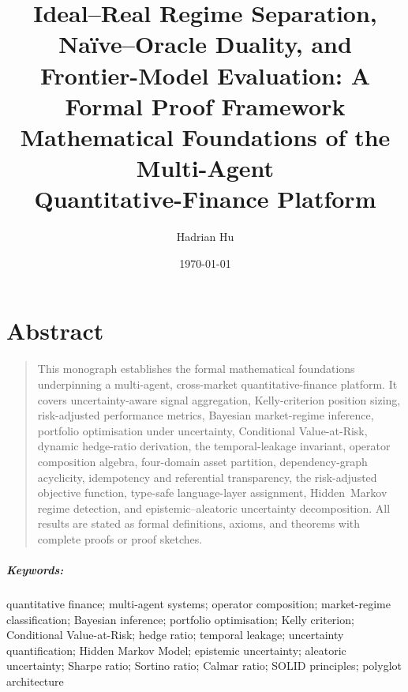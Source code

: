 \documentclass[12pt,openany]{book}
\title{Ideal--Real Regime Separation, Na\"{i}ve--Oracle Duality, and\\
Frontier-Model Evaluation: A Formal Proof Framework\\[0.6em]
{\large Mathematical Foundations of the Multi-Agent\\
Quantitative-Finance Platform}}
\author{Hadrian Hu}
\date{\today}
\numberwithin{equation}{chapter}
\theoremstyle{plain}
\theoremstyle{definition}
\theoremstyle{remark}
\newenvironment{abstract}{%
  \chapter*{Abstract}
  \begin{quote}\small
}{%
  \end{quote}
}
\newenvironment{keywords}{%
  \paragraph*{Keywords:}
}{%
}
\numberwithin{equation}{chapter}
\theoremstyle{plain}
\begin{document}
\maketitle

\label{thm:uncertainty-bounded}
\label{thm:kelly-optimal}
\label{thm:kelly-ruin}
\label{thm:sharpe-bound}
\label{thm:sortino-ge-sharpe}
\label{thm:calmar-bound}
\label{thm:bayes-convergence}
\label{thm:portfolio-opt}
\label{thm:cvar-bound}
\label{thm:assoc}
\label{thm:acyclic-decidable}
\label{thm:idempotent}
\label{thm:leakage-invariant}
\label{thm:type-safe}
\label{thm:hmm-convergence}
\label{thm:uncertainty-decomp}

\tableofcontents
\listoftheorems[ignoreall,show={theorem,lemma,proposition,corollary,definition,axiom,assumption,conjecture}]

\begin{abstract}
This monograph establishes the formal mathematical foundations underpinning
a multi-agent, cross-market quantitative-finance platform.  It covers
uncertainty-aware signal aggregation, Kelly-criterion position sizing,
risk-adjusted performance metrics, Bayesian market-regime inference,
portfolio optimisation under uncertainty, Conditional Value-at-Risk,
dynamic hedge-ratio derivation, the temporal-leakage invariant, operator
composition algebra, four-domain asset partition, dependency-graph
acyclicity, idempotency and referential transparency, the risk-adjusted
objective function, type-safe language-layer assignment, Hidden~Markov
regime detection, and epistemic--aleatoric uncertainty decomposition.
All results are stated as formal definitions, axioms, and theorems with
complete proofs or proof sketches.
\end{abstract}

\begin{keywords}
quantitative finance; multi-agent systems; operator composition; market-regime
classification; Bayesian inference; portfolio optimisation; Kelly criterion;
Conditional Value-at-Risk; hedge ratio; temporal leakage; uncertainty
quantification; Hidden Markov Model; epistemic uncertainty; aleatoric uncertainty;
Sharpe ratio; Sortino ratio; Calmar ratio; SOLID principles; polyglot architecture
\end{keywords}
\end{document}
